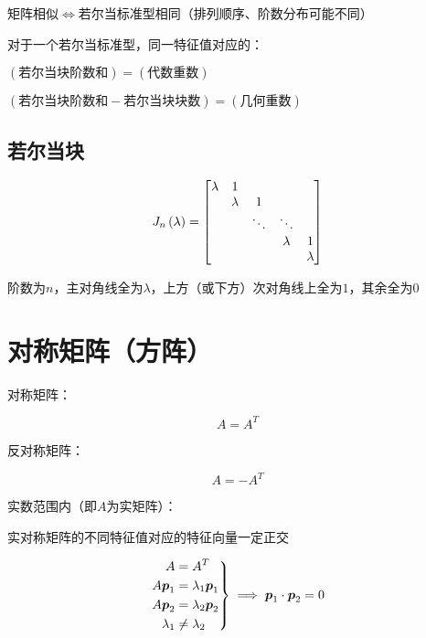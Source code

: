 \documentclass{article}
\begin{document}
矩阵相似$\iff$若尔当标准型相同（排列顺序、阶数分布可能不同）

对于一个若尔当标准型，同一特征值对应的：

$(\text{若尔当块阶数和})=(\text{代数重数})$

$(\text{若尔当块阶数和}-\text{若尔当块块数})=(\text{几何重数})$

\subsection{若尔当块}

\begin{definition}
    \[J_n\left(\lambda\right)=
        \begin{bmatrix}
            \lambda & 1       &        &         &         \\
                    & \lambda & 1      &         &         \\
                    &         & \ddots & \ddots  &         \\
                    &         &        & \lambda & 1       \\
                    &         &        &         & \lambda
        \end{bmatrix}\]
\end{definition}

阶数为$n$，主对角线全为$\lambda$，上方（或下方）次对角线上全为$1$，其余全为$0$

\section{对称矩阵（方阵）}

\begin{definition}
    对称矩阵：

    \[A=A^T\]

    反对称矩阵：

    \[A=-A^T\]
\end{definition}

实数范围内（即$A$为实矩阵）：

实对称矩阵的不同特征值对应的特征向量一定正交

\[\left.\begin{aligned}
        A         & =A^T            \\
        A\boldsymbol p_1    & =\lambda_1\boldsymbol p_1 \\
        A\boldsymbol p_2    & =\lambda_2\boldsymbol p_2 \\
        \lambda_1 & \neq\lambda_2
    \end{aligned}\right\}
    \implies \boldsymbol p_1\cdot\boldsymbol p_2=0\]
\end{document}
